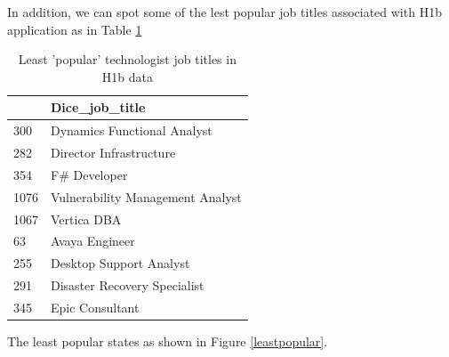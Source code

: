In addition, we can spot some of the lest popular job titles associated with H1b application as in Table \ref{leastpopularjob}
	\begin{table}[h]
	\caption{Least 'popular' technologist job titles in  H1b data}
	\label{leastpopularjob}
	\resizebox{\columnwidth}{!}
	{%
	\begin{tabular}{ll}
		\hline
		{} &                    Dice\_job\_title \\
		\hline
		300  &       Dynamics Functional Analyst \\
		282  &           Director Infrastructure \\
		354  &                      F\# Developer \\
		1076 &  Vulnerability Management Analyst \\
		1067 &                       Vertica DBA \\
		63   &                    Avaya Engineer \\
		255  &           Desktop Support Analyst \\
		291  &      Disaster Recovery Specialist \\
		345  &                   Epic Consultant \\
		\hline
	\end{tabular}
	}
\end{table}
The least popular states as shown in Figure \ref{leastpopular}. \\
